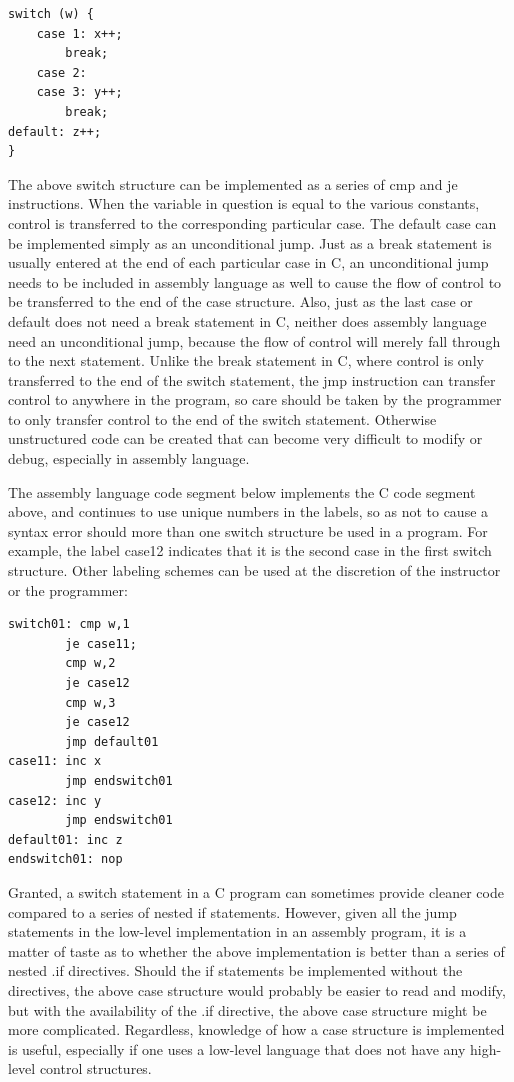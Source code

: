 \documentclass[10pt]{book}
\begin{document}
\begin{verbatim}
switch (w) {
    case 1: x++;
        break;
    case 2:
    case 3: y++;
        break;
default: z++;
}
\end{verbatim}

The above switch structure can be implemented as a series of cmp and je instructions. When the variable in question is equal to the various constants, control is transferred to the corresponding particular case. The default case can be implemented simply as an unconditional jump. Just as a break statement is usually entered at the end of each particular case in C, an unconditional jump needs to be included in assembly language as well to cause the flow of control to be transferred to the end of the case structure. Also, just as the last case or default does not need a break statement in C, neither does assembly language need an unconditional jump, because the flow of control will merely fall through to the next statement. Unlike the break statement in C, where control is only transferred to the end of the switch statement, the jmp instruction can transfer control to anywhere in the program, so care should be taken by the programmer to only transfer control to the end of the switch statement. Otherwise unstructured code can be created that can become very difficult to modify or debug, especially in assembly language.

The assembly language code segment below implements the C code segment above, and continues to use unique numbers in the labels, so as not to cause a syntax error should more than one switch structure be used in a program. For example, the label case12 indicates that it is the second case in the first switch structure. Other labeling schemes can be used at the discretion of the instructor or the programmer:
\begin{verbatim}
switch01: cmp w,1
        je case11;
        cmp w,2
        je case12
        cmp w,3
        je case12
        jmp default01
case11: inc x
        jmp endswitch01
case12: inc y
        jmp endswitch01
default01: inc z
endswitch01: nop
\end{verbatim}

Granted, a switch statement in a C program can sometimes provide cleaner code compared to a series of nested if statements. However, given all the jump statements in the low-level implementation in an assembly program, it is a matter of taste as to whether the above implementation is better than a series of nested .if directives. Should the if statements be implemented without the directives, the above case structure would probably be easier to read and modify, but with the availability of the .if directive, the above case structure might be more complicated. Regardless, knowledge of how a case structure is implemented is useful, especially if one uses a low-level language that does not have any high-level control structures.
\end{document}
